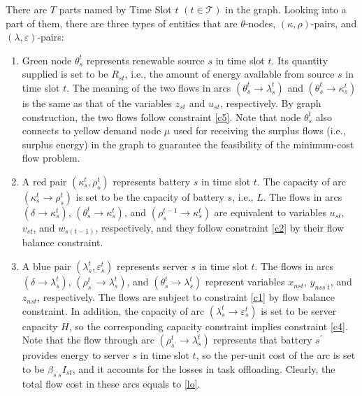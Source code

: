 \documentclass[conference, 10pt, ﬁnal, letterpaper, twocolumn]{IEEEtran}
\begin{document}
There are $T$ parts named by Time Slot $t$ $(t\in \mathcal{T})$ in the graph. Looking into a part of them, there are three types of entities that are $\theta$-nodes, $(\kappa, \rho)$-pairs, and $(\lambda, \varepsilon)$-pairs:
\begin{enumerate}
    \item Green node $\theta^{t}_{s}$ represents renewable source $s$ in time slot $t$. Its quantity supplied is set to be $R_{st}$, i.e., the amount of energy available from source $s$ in time slot $t$. The meaning of the two flows in arcs $(\theta^{t}_{s}\rightarrow \lambda^{t}_{s})$ and $(\theta^{t}_{s}\rightarrow \kappa^{t}_{s})$ is the same as that of the variables $z_{st}$ and $u_{st}$, respectively. By graph construction, the two flows follow constraint \eqref{c5}. Note that node $\theta^{t}_{s}$ also connects to yellow demand node $\mu$ used for receiving the surplus flows (i.e., surplus energy) in the graph to guarantee the feasibility of the minimum-cost flow problem.
    \item A red pair $(\kappa^{t}_{s}, \rho^{t}_{s})$ represents battery $s$ in time slot $t$. The capacity of arc $(\kappa^{t}_{s}\rightarrow \rho^{t}_{s})$ is set to be the capacity of battery $s$, i.e., $L$. The flows in arcs $(\delta \rightarrow \kappa^{t}_{s})$, $(\theta^{t}_{s} \rightarrow \kappa^{t}_{s})$, and $(\rho^{t-1}_{s}\rightarrow \kappa^{t}_{s})$ are equivalent to variables $u_{st}$, $v_{st}$, and $w_{s(t-1)}$, respectively, and they follow constraint \eqref{c2} by their flow balance constraint.
    \item A blue pair $(\lambda^{t}_{s}, \varepsilon^{t}_{s})$ represents server $s$ in time slot $t$. The flows in arcs $(\delta \rightarrow \lambda^{t}_{s})$, $(\rho^{t}_{s^\prime} \rightarrow \lambda^{t}_{s})$, and $(\theta^{t}_{s} \rightarrow \lambda^{t}_{s} )$ represent variables $x_{nst}$, $y_{nss^\prime t}$, and $z_{nst}$, respectively. The flows are subject to constraint \eqref{c1} by flow balance constraint. In addition, the capacity of arc $(\lambda^{t}_{s}\rightarrow\varepsilon^{t}_{s})$ is set to be server capacity $H$, so the corresponding capacity constraint implies constraint \eqref{c4}. Note that the flow through arc $(\rho^{t}_{s^\prime}\rightarrow\lambda^{t}_{s})$ represents that battery $s^\prime$ provides energy to server $s$ in time slot $t$, so the per-unit cost of the arc is set to be $\beta_{s^\prime s} I_{st}$, and it accounts for the losses in task offloading. Clearly, the total flow cost in these arcs equals to \eqref{lo}.
\end{enumerate}
\end{document}
